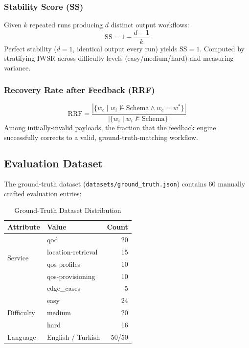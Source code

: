 \documentclass[conference]{IEEEtran}
\begin{document}
\subsubsection{Stability Score (SS)}
Given $k$ repeated runs producing $d$ distinct output workflows:
\begin{equation}
  \text{SS} = 1 - \frac{d - 1}{k}
\end{equation}
Perfect stability ($d=1$, identical output every run) yields $\text{SS}=1$.
Computed by stratifying IWSR across difficulty levels (easy/medium/hard)
and measuring variance.

\subsubsection{Recovery Rate after Feedback (RRF)}
\begin{equation}
  \text{RRF} = \frac{|\{w_c \mid w_i \not\models \text{Schema} \land w_c = w^*\}|}
               {|\{w_i \mid w_i \not\models \text{Schema}\}|}
\end{equation}
Among initially-invalid payloads, the fraction that the feedback engine
successfully corrects to a valid, ground-truth-matching workflow.

\subsection{Evaluation Dataset}

The ground-truth dataset (\texttt{datasets/ground\_truth.json}) contains
60 manually crafted evaluation entries:

\begin{table}[H]
\centering
\caption{Ground-Truth Dataset Distribution}
\label{tab:dataset}
\scriptsize
\begin{tabular}{llr}
\toprule
\textbf{Attribute} & \textbf{Value} & \textbf{Count} \\
\midrule
\multirow{4}{*}{Service} & qod & 20 \\
 & location-retrieval & 15 \\
 & qos-profiles & 10 \\
 & qos-provisioning & 10 \\
 & edge\_cases & 5 \\
\midrule
\multirow{3}{*}{Difficulty} & easy & 24 \\
 & medium & 20 \\
 & hard & 16 \\
\midrule
Language & English / Turkish & 50/50 \\
\bottomrule
\end{tabular}
\end{table}
\end{document}
